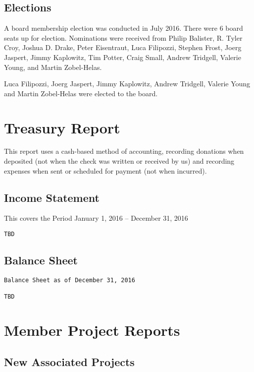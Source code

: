 \documentclass[letterpaper]{report}
\begin{document}
\section{Elections}

A board membership election was conducted in July 2016.  There were 6
board seats up for election.  Nominations were received from Philip
Balister, R. Tyler Croy, Joshua D. Drake, Peter Eisentraut, Luca
Filipozzi, Stephen Frost, Joerg Jaspert, Jimmy Kaplowitz, Tim Potter,
Craig Small, Andrew Tridgell, Valerie Young, and Martin Zobel-Helas.

Luca Filipozzi, Joerg Jaspert, Jimmy Kaplowitz, Andrew Tridgell, Valerie
Young and Martin Zobel-Helas were elected to the board.

\chapter{Treasury Report}

This report uses a cash-based method of accounting, recording donations when
deposited (not when the check was written or received by us) and recording
expenses when sent or scheduled for payment (not when incurred).

\section{Income Statement}

This covers the Period January 1, 2016 -- December 31, 2016

\begin{verbatim}
TBD
\end{verbatim}

\section{Balance Sheet}

\begin{verbatim}
Balance Sheet as of December 31, 2016

TBD
\end{verbatim}

\chapter{Member Project Reports}

\section{New Associated Projects}
\end{document}
